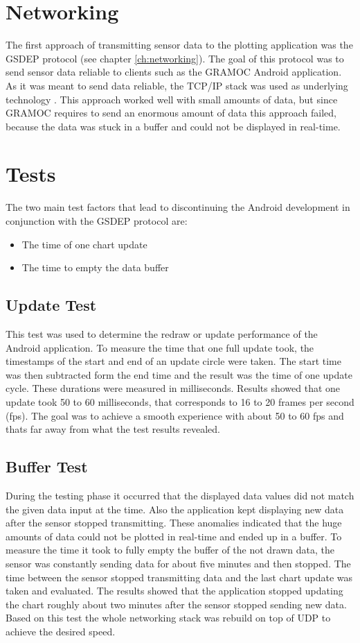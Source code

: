 \section{Networking}
The first approach of transmitting sensor data to the plotting application was the GSDEP protocol (see chapter \vref{ch:networking}). The goal of this protocol was to send sensor data reliable to clients such as the GRAMOC Android application. As it was meant to send data reliable, the TCP/IP stack was used as underlying technology \autocite{rfc793, rfc791}. This approach worked well with small amounts of data, but since GRAMOC requires to send an enormous amount of data this approach failed, because the data was stuck in a buffer and could not be displayed in real-time.

\section{Tests}
\label{sec:Tests}
The two main test factors that lead to discontinuing the Android development in conjunction with the GSDEP protocol are:

\begin{itemize}
    \item The time of one chart update
    \item The time to empty the data buffer
\end{itemize}

\subsection{Update Test}
This test was used to determine the redraw or update performance of the Android application. To measure the time that one full update took, the timestamps of the start and end of an update circle were taken. The start time was then subtracted form the end time and the result was the time of one update cycle. These durations were measured in milliseconds. Results showed that one update took 50 to 60 milliseconds, that corresponds to 16 to 20 frames per second (fps). The goal was to achieve a smooth experience with about 50 to 60 fps and thats far away from what the test results revealed.

\subsection{Buffer Test}
During the testing phase it occurred that the displayed data values did not match the given data input at the time. Also the application kept displaying new data after the sensor stopped transmitting. These anomalies indicated that the huge amounts of data could not be plotted in real-time and ended up in a buffer. To measure the time it took to fully empty the buffer of the not drawn data, the sensor was constantly sending data for about five minutes and then stopped. The time between the sensor stopped transmitting data and the last chart update was taken and evaluated. The results showed that the application stopped updating the chart roughly about two minutes after the sensor stopped sending new data. Based on this test the whole networking stack was rebuild on top of UDP to achieve the desired speed.

